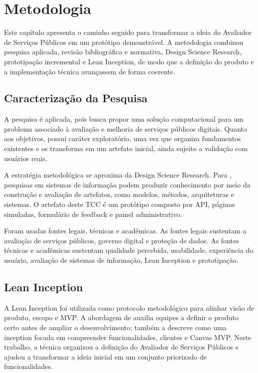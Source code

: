 \chapter{Metodologia}

Este capítulo apresenta o caminho seguido para transformar a ideia do Avaliador
de Serviços Públicos em um protótipo demonstrável. A metodologia combinou
pesquisa aplicada, revisão bibliográfica e normativa, Design Science Research,
prototipação incremental e Lean Inception, de modo que a definição do produto e
a implementação técnica avançassem de forma coerente.

\section{Caracterização da Pesquisa}

A pesquisa é aplicada, pois busca propor uma solução computacional para um
problema associado à avaliação e melhoria de serviços públicos digitais. Quanto
aos objetivos, possui caráter exploratório, uma vez que organiza fundamentos
existentes e os transforma em um artefato inicial, ainda sujeito a validação com
usuários reais.

A estratégia metodológica se aproxima da Design Science Research. Para
, pesquisas em sistemas de informação podem
produzir conhecimento por meio da construção e avaliação de artefatos, como
modelos, métodos, arquiteturas e sistemas. O artefato deste TCC é um protótipo
composto por API, páginas simuladas, formulário de feedback e painel
administrativo.

Foram usadas fontes legais, técnicas e acadêmicas. As fontes legais sustentam a
avaliação de serviços públicos, governo digital e proteção de dados. As fontes
técnicas e acadêmicas sustentam qualidade percebida, usabilidade, experiência do
usuário, avaliação de sistemas de informação, Lean Inception e prototipação.

\section{Lean Inception}

A Lean Inception foi utilizada como protocolo metodológico para alinhar visão de
produto, escopo e MVP. A abordagem de 
auxilia equipes a definir o produto certo antes de ampliar o desenvolvimento;
 também a descreve como uma inception focada
em compreender funcionalidades, clientes e Canvas MVP. Neste trabalho, a técnica
organizou a definição do Avaliador de Serviços Públicos e ajudou a transformar a
ideia inicial em um conjunto priorizado de funcionalidades.

